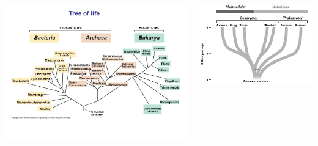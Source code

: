 \documentclass[10pt]{beamer}
\begin{document}
\begin{frame}
	\begin{columns}
		\begin{column}{0.5\textwidth}
			\begin{center}
				\includegraphics[width=1.0\textwidth]{figures/tree4.jpg}
			\end{center}
		\end{column}
		
		\begin{column}{0.5\textwidth}
			\begin{center}
				\includegraphics[width=1.0\textwidth]{figures/tree3.png}
			\end{center}
		\end{column}
	\end{columns}
\end{frame}
\end{document}
